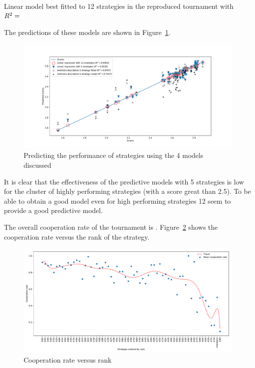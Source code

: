 \documentclass{article}
\begin{document}
\begin{table}[!hbtp]
        \centering
        
        \caption{Linear model best fitted to 12 strategies in the reproduced tournament
                 with
             \(R^2=\protect\)}
        \label{tbl:original_tournament_predictive_12_model}
\end{table}

The predictions of these models are shown in
Figure~\ref{fig:original_tournament_predictive_score_models}.

\begin{figure}[!hbtp]
    \centering
    \includegraphics[width=.9\textwidth]{assets/original_tournament_predictive_score_models.pdf}
    \caption{Predicting the performance of strategies using the 4 models
             discussed}
    \label{fig:original_tournament_predictive_score_models}
\end{figure}

It is clear that the effectiveness of the predictive models with 5 strategies is
low for the cluster of highly performing strategies (with a score great than
2.5). To be able to obtain a good model even for high performing strategies 12
seem to provide a good predictive model.

The overall cooperation rate of the tournament
is .
Figure~\ref{fig:original_tournament_cooperation_rate_versus_rank} shows the
cooperation rate versus the rank of the strategy.

\begin{figure}[!hbtp]
    \centering
    \includegraphics[width=.8\textwidth]{assets/original_tournament_cooperation_rate_versus_rank.pdf}
    \caption{Cooperation rate versus rank}
    \label{fig:original_tournament_cooperation_rate_versus_rank}
\end{figure}
\end{document}
